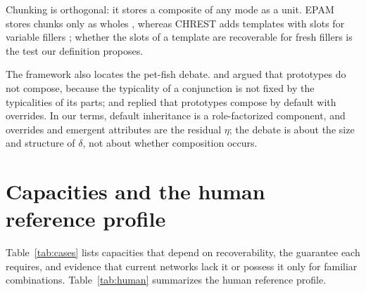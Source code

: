 \documentclass[10pt]{article}
\theoremstyle{plain}
\theoremstyle{remark}
\begin{document}
\noindent
Chunking is orthogonal: it stores a composite of any mode as a unit. EPAM stores chunks only as wholes \citep{feigenbaum1984}, whereas CHREST adds templates with slots for variable fillers \citep{gobet1996templates,gobet2000}; whether the slots of a template are recoverable for fresh fillers is the test our definition proposes.

The framework also locates the pet-fish debate. \citet{osherson1981} and \citet{fodor1996} argued that prototypes do not compose, because the typicality of a conjunction is not fixed by the typicalities of its parts; \citet{kamp1995} and \citet{hampton2012} replied that prototypes compose by default with overrides. In our terms, default inheritance is a role-factorized component, and overrides and emergent attributes are the residual $\eta$; the debate is about the size and structure of $\delta$, not about whether composition occurs.

\section{Capacities and the human reference profile}
\label{app:cases}

Table~\ref{tab:cases} lists capacities that depend on recoverability, the guarantee each requires, and evidence that current networks lack it or possess it only for familiar combinations. Table~\ref{tab:human} summarizes the human reference profile.
\end{document}
